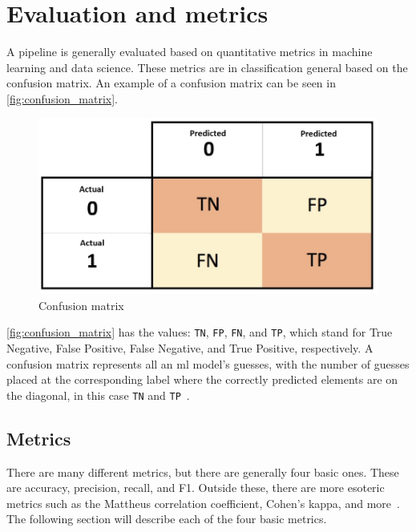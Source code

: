 \section{Evaluation and metrics}\label{sec:evalueation}
A pipeline is generally evaluated based on quantitative metrics in machine learning and data science. These metrics are in classification general based on the confusion matrix. An example of a confusion matrix can be seen in \autoref{fig:confusion_matrix}.

\begin{figure}[htb!]
    \centering
    \includegraphics[scale=0.3]{figures/Confusion_Matrix.jpg}
    \caption{Confusion matrix~\cite{confusion-matrix}}
    \label{fig:confusion_matrix}
\end{figure}

\autoref{fig:confusion_matrix} has the values: \texttt{TN}, \texttt{FP}, \texttt{FN}, and \texttt{TP}, which stand for True Negative, False Positive, False Negative, and True Positive, respectively.
A confusion matrix represents all an \gls{ml} model's guesses, with the number of guesses placed at the corresponding label where the correctly predicted elements are on the diagonal, in this case \texttt{TN} and \texttt{TP}~\cite{james-statistical-learning}.

\subsection{Metrics}\label{subsec:metrics}
There are many different metrics, but there are generally four basic ones. These are accuracy, precision, recall, and F1. Outside these, there are more esoteric metrics such as the Mattheus correlation coefficient, Cohen's kappa, and more~\cite{metrics-for-multi}. The following section will describe each of the four basic metrics.

